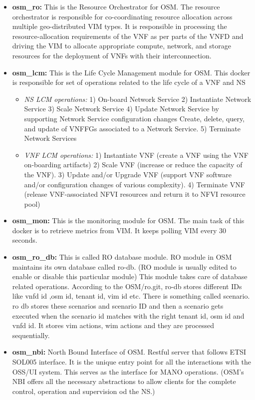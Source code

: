 \begin{itemize}
	\item \textbf{osm\_ro:} This is the Resource Orchestrator for OSM. 
	The resource orchestrator is responsible for co-coordinating resource allocation across multiple geo-distributed VIM types.
	It is responsible in processing the resource-allocation requirements of the VNF as per parts of the VNFD and driving the VIM to allocate appropriate compute, network, and storage resources for the deployment of VNFs with their interconnection. 
	
	\item \textbf{osm\_lcm:} This is the Life Cycle Management module for OSM. 
	This docker is responsible for set of operations related to the life cycle of a VNF and NS
	
	\begin{itemize}
		\item \textit{NS LCM operations:} 
		1) On-board Network Service
		2) Instantiate Network Service
		3) Scale Network Service
		4) Update Network Service by supporting Network Service configuration changes
		Create, delete, query, and update of VNFFGs associated to a Network Service.
		5) Terminate Network Services
		
		\item \textit{VNF LCM operations:} 1) Instantiate VNF (create a VNF using the VNF on-boarding artifacts)
		2) Scale VNF (increase or reduce the capacity of the VNF).
		3) Update and/or Upgrade VNF (support VNF software and/or configuration changes of various complexity).
		4) Terminate VNF (release VNF-associated NFVI resources and return it to NFVI resource pool)
	\end{itemize}
	
	
	
	\item \textbf{osm\_mon:} This is the monitoring module for OSM. 
	The main task of this docker is to retrieve metrics from VIM. 
	It keeps polling VIM every 30 seconds. 
	
	\item \textbf{osm\_ro\_db:} This is called RO database module.
	RO module in OSM maintains its own database called ro-db. (RO module is usually edited to enable or disable this particular module)
	This module takes care of database related operations. According to the OSM/ro.git, ro-db stores different IDs like vnfd id ,osm id, tenant id, vim id etc. There is something called scenario. ro db stores these scenarios and scenario ID and then a scenario gets executed when the scenario id matches with the right tenant id, osm id and vnfd id. 
	It stores vim actions, wim actions and they are processed sequentially. 
	
	\item \textbf{osm\_nbi:} North Bound Interface of OSM. Restful server that follows ETSI SOL005 interface.
	It is the unique entry point for all the interactions with the OSS/UI system.
	This serves as the interface for MANO operations.
	(OSM's NBI offers all the necessary abstractions to allow clients for the complete control, operation and supervision od the NS.)
\end{itemize}

